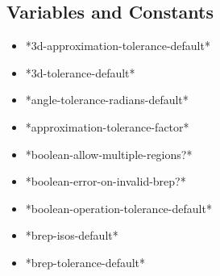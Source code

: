 \documentclass [11pt]{book}
\begin{document}
\subsection{Variables and Constants}

\label{subsec:variablesandconstants}



\begin{itemize}

\item {}*3d-approximation-tolerance-default*





\item {}*3d-tolerance-default*





\item {}*angle-tolerance-radians-default*





\item {}*approximation-tolerance-factor*





\item {}*boolean-allow-multiple-regions?*





\item {}*boolean-error-on-invalid-brep?*





\item {}*boolean-operation-tolerance-default*





\item {}*brep-isos-default*





\item {}*brep-tolerance-default*






\end{itemize}
\end{document}
